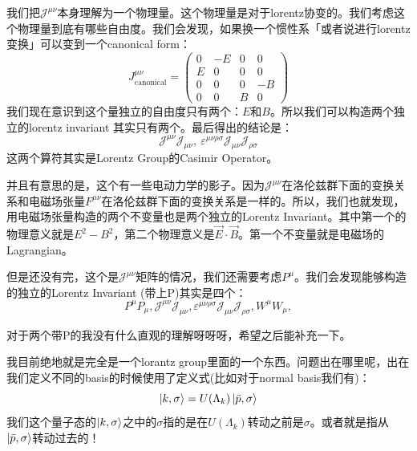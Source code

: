 我们把$ \mathcal{J^{\mu\nu}} $本身理解为一个物理量。这个物理量是对于lorentz协变的。我们考虑这个物理量到底有哪些自由度。我们会发现，如果换一个惯性系「或者说进行lorentz变换」可以变到一个canonical form：
\begin{equation}
 J_{\mathrm{canonical}}^{\mu\nu}=\begin{pmatrix}0&-E&0&0\\E&0&0&0\\0&0&0&-B\\0&0&B&0\end{pmatrix} 
  \label{eq:canonicalformofJ}
\end{equation}
我们现在意识到这个量独立的自由度只有两个：$ E $和$ B $。所以我们可以构造两个独立的lorentz invariant 其实只有两个。最后得出的结论是：
\begin{equation}
  \mathcal{J}^{\mu\nu}\mathcal{J}_{\mu\nu},\mathrm{~}\varepsilon^{\mu\nu\rho\sigma}\mathcal{J}_{\mu\nu}\mathcal{J}_{\rho\sigma}
  \label{eq:indep}
\end{equation}
这两个算符其实是Lorentz Group的Casimir Operator。

并且有意思的是，这个有一些电动力学的影子。因为$ \mathcal{J}^{\mu\nu} $在洛伦兹群下面的变换关系和电磁场张量$ F^{\mu\nu} $在洛伦兹群下面的变换关系是一样的。所以，我们也就发现，用电磁场张量构造的两个不变量也是两个独立的Lorentz Invariant。其中第一个的物理意义就是$ E^2-B^2 $，第二个物理意义是$ \vec{E}\cdot\vec{B} $。第一个不变量就是电磁场的Lagrangian。


但是还没有完，这个是$ \mathcal{J}^{\mu\nu} $矩阵的情况，我们还需要考虑$ P^\mu $。我们会发现能够构造的独立的Lorentz Invariant (带上P)其实是四个：\begin{equation}
  P^{\mu}P_{\mu},\mathcal{J}^{\mu\nu}\mathcal{J}_{\mu\nu},\varepsilon^{\mu\nu\rho\sigma}\mathcal{J}_{\mu\nu}\mathcal{J}_{\rho\sigma},W^{\mu}W_{\mu},
  \label{eq:fourinvariant}
\end{equation}

对于两个带P的我没有什么直观的理解呀呀呀，希望之后能补充一下。



我目前绝地就是完全是一个lorantz group里面的一个东西。问题出在哪里呢，出在我们定义不同的basis的时候使用了定义式(比如对于normal basis我们有)：
\begin{equation}
  \ket{k,\sigma} = U(\Lambda_k)\ket{\bar{p},\sigma}
  \label{eq:definebasis}
\end{equation}
我们这个量子态的$ \ket{k,\sigma} $之中的$ \sigma $指的是在$ U(\Lambda_k) $转动之前是$ \sigma $。或者就是指从$ \ket{\bar{p},\sigma} $转动过去的！
